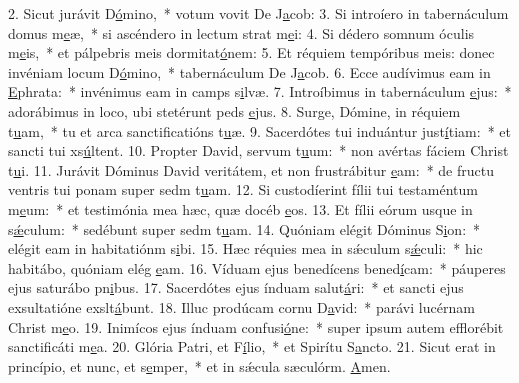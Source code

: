 2. Sicut jurávit D\uline{ó}mino,~* votum vovit De J\uline{a}cob:
3. Si introíero in tabernáculum domus m\uline{e}æ,~* si ascéndero in lectum strat m\uline{e}i:
4. Si dédero somnum óculis m\uline{e}is,~* et pálpebris meis dormitat\uline{ó}nem:
5. Et réquiem tempóribus meis: donec invéniam locum D\uline{ó}mino,~* tabernáculum De J\uline{a}cob.
6. Ecce audívimus eam in \uline{E}phrata:~* invénimus eam in camps s\uline{i}lvæ.
7. Introíbimus in tabernáculum \uline{e}jus:~* adorábimus in loco, ubi stetérunt peds \uline{e}jus.
8. Surge, Dómine, in réquiem t\uline{u}am,~* tu et arca sanctificatións t\uline{u}æ.
9. Sacerdótes tui induántur just\uline{í}tiam:~* et sancti tui xs\uline{ú}ltent.
10. Propter David, servum t\uline{u}um:~* non avértas fáciem Christ t\uline{u}i.
11. Jurávit Dóminus David veritátem, et non frustrábitur \uline{e}am:~* de fructu ventris tui ponam super sedm t\uline{u}am.
12. Si custodíerint fílii tui testaméntum m\uline{e}um:~* et testimónia mea hæc, quæ docéb \uline{e}os.
13. Et fílii eórum usque in s\uline{ǽ}culum:~* sedébunt super sedm t\uline{u}am.
14. Quóniam elégit Dóminus S\uline{i}on:~* elégit eam in habitatiónm s\uline{i}bi.
15. Hæc réquies mea in sǽculum s\uline{ǽ}culi:~* hic habitábo, quóniam elég \uline{e}am.
16. Víduam ejus benedícens bened\uline{í}cam:~* páuperes ejus saturábo pn\uline{i}bus.
17. Sacerdótes ejus índuam salut\uline{á}ri:~* et sancti ejus exsultatióne exslt\uline{á}bunt.
18. Illuc prodúcam cornu D\uline{a}vid:~* parávi lucérnam Christ m\uline{e}o.
19. Inimícos ejus índuam confusi\uline{ó}ne:~* super ipsum autem efflorébit sanctificáti m\uline{e}a.
20. Glória Patri, et F\uline{í}lio,~* et Spirítu S\uline{a}ncto.
21. Sicut erat in princípio, et nunc, et s\uline{e}mper,~* et in sǽcula sæculórm. \uline{A}men.

